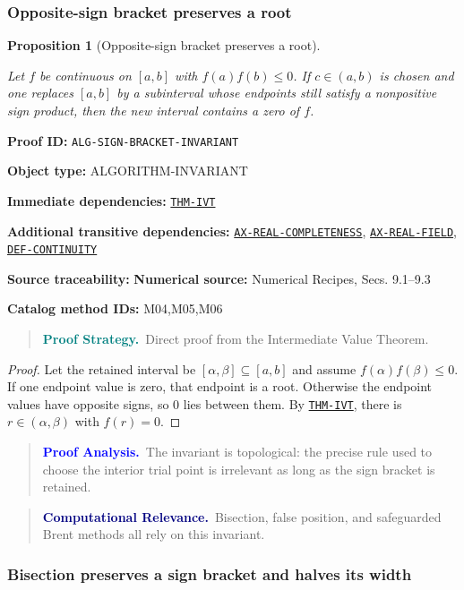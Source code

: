 \documentclass[10pt]{article}
\newcommand{\pidraw}[1]{\begingroup\urlstyle{tt}\nolinkurl{#1}\endgroup}
\newcommand{\pidref}[1]{\hyperref[prf:#1]{\pidraw{#1}}}
\newcommand{\pid}[1]{\pidref{#1}}
\newtheorem{proposition}[theorem]{Proposition}
\theoremstyle{definition}
\theoremstyle{remark}
\newenvironment{proofstrategy}
{\begin{quote}\small\noindent\textbf{\textcolor{teal}{Proof Strategy.}}\ }
{\end{quote}}
\newenvironment{proofanalysis}
{\begin{quote}\small\noindent\textbf{\textcolor{blue}{Proof Analysis.}}\ }
{\end{quote}}
\newenvironment{computationalrelevance}
{\begin{quote}\small\noindent\textbf{\textcolor{navy}{Computational Relevance.}}\ }
{\end{quote}}
\newcommand{\meta}[2]{\noindent\textbf{#1:} #2\par}
\begin{document}
\subsubsection{Opposite-sign bracket preserves a root}

\begin{proposition}[Opposite-sign bracket preserves a root]\label{prf:ALG-SIGN-BRACKET-INVARIANT}

Let $f$ be continuous on $[a,b]$ with $f(a)f(b)\le0$. If $c\in(a,b)$ is chosen and one replaces $[a,b]$ by a subinterval whose endpoints still satisfy a nonpositive sign product, then the new interval contains a zero of $f$.

\end{proposition}

\meta{Proof ID}{\pidraw{ALG-SIGN-BRACKET-INVARIANT}}
\meta{Object type}{ALGORITHM-INVARIANT}
\meta{Immediate dependencies}{\pidref{THM-IVT}}
\meta{Additional transitive dependencies}{\pidref{AX-REAL-COMPLETENESS}, \pidref{AX-REAL-FIELD}, \pidref{DEF-CONTINUITY}}
\meta{Source traceability}{\textbf{Numerical source:} Numerical Recipes, Secs. 9.1--9.3}
\meta{Catalog method IDs}{M04,M05,M06}

\begin{proofstrategy}Direct proof from the Intermediate Value Theorem.\end{proofstrategy}

\begin{proof}

Let the retained interval be $[\alpha,\beta]\subseteq[a,b]$ and assume
$f(\alpha)f(\beta)\le0$. If one endpoint value is zero, that endpoint is a root.
Otherwise the endpoint values have opposite signs, so $0$ lies between them.
By \pid{THM-IVT}, there is $r\in(\alpha,\beta)$ with $f(r)=0$.

\end{proof}

\begin{proofanalysis}The invariant is topological: the precise rule used to choose the interior trial point is irrelevant as long as the sign bracket is retained.\end{proofanalysis}

\begin{computationalrelevance}Bisection, false position, and safeguarded Brent methods all rely on this invariant.\end{computationalrelevance}

\subsubsection{Bisection preserves a sign bracket and halves its width}
\end{document}
